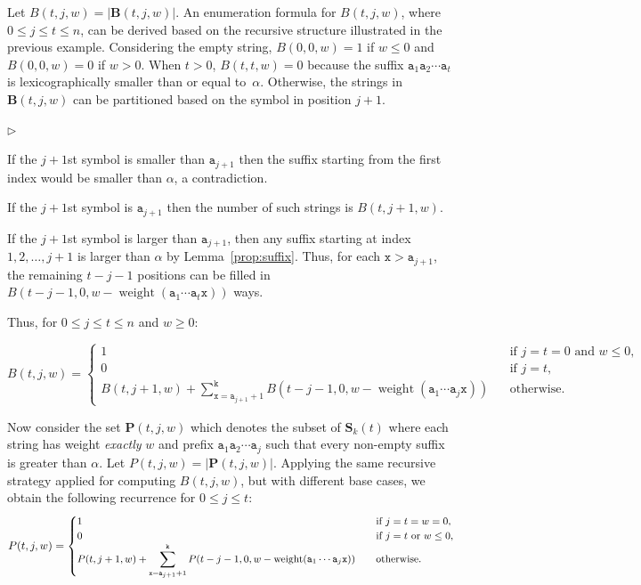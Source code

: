 \documentclass[US-letter,USenglish,authorcolumns,autoref]{lipics-v2021}
\renewcommand{\tt} {\mathtt}
\newcommand{\squishlisttwo}{
 \begin{list}{$\triangleright$}
  { \setlength{\itemsep}{0pt}
     \setlength{\parsep}{0pt}
    \setlength{\topsep}{0pt}
    \setlength{\partopsep}{0pt}
    \setlength{\leftmargin}{2em}
    \setlength{\labelwidth}{1.5em}
    \setlength{\labelsep}{0.5em} } }
\newcommand{\squishend}{
  \end{list}  }
\newcommand{\bS}{\mathbf{S}}
\DeclareMathOperator{\wt}{weight}
\begin{document}
%
\noindent
Let $B(t,j,w) = |\mathbf{B}(t,j,w)|$.
An enumeration formula for $B(t,j,w)$, where $0\leq j\leq t \leq n$, can be derived based on the recursive structure illustrated in the previous example.  Considering the empty string, $B(0,0,w) = 1$ if $w \leq 0$ and $B(0,0,w) = 0$ if $w > 0$.  When $t > 0$,  $B(t,t,w) = 0$ because  the suffix $\tt{a}_1\tt{a}_2\cdots \tt{a}_t$ is  lexicographically smaller than or equal to~$\alpha$.  Otherwise, the strings in $\mathbf{B}(t,j,w)$ can be partitioned based on the symbol in position $j{+}1$.
\squishlisttwo
\item If the $j{+}1$st symbol is smaller than $\tt{a}_{j+1}$  then the suffix starting from the first index would be smaller than $\alpha$, a contradiction.  
\item If the $j{+}1$st  symbol is $\tt{a}_{j+1}$ then the number of such strings is $B(t,j+1,w)$.  
\item If the $j{+}1$st  symbol is larger than $\tt{a}_{j+1}$, then any suffix starting at index $1,2,\ldots, j+1$ is 
larger than $\alpha$ by Lemma~\ref{prop:suffix}.  Thus, for each $\tt{x} > \tt{a}_{j+1}$, the remaining $t-j-1$ positions can be filled in $B(t-j-1,0,w-\wt(\tt{a}_1\cdots \tt{a}_t\tt{x}))$ ways.  
\squishend
Thus, for $0\leq j\leq t \leq n$ and $w \geq 0$:
%
\begin{center} \small
$B(t,j,w)  = \left\{ \begin{array}{ll}
    1	 \ & \ \  \   \mbox{if \ \ $j=t=0$ and $w \leq 0$, } \\
    0	 \ & \ \  \  \mbox{if \ \ $j=t$,} \\
    B(t,j+1,w) + \displaystyle{\sum_{\tt{x} = \tt{a}_{j+1}+1}^\tt{k} B(t-j-1,0, w-\wt(\tt{a}_1\cdots \tt{a}_j\tt{x})) } \  &\ \ \  \mbox{otherwise.}
    \end{array} \right.
            \label{eq:B}$
\end{center}
%


Now consider the set $\mathbf{P}(t,j,w)$ which denotes the subset of  $\bS_k(t)$ where each string has weight \emph{exactly} $w$ and prefix  $\tt{a}_1\tt{a}_2\cdots \tt{a}_{j}$ such that every non-empty suffix is greater than $\alpha$. Let $P(t,j,w) = |\mathbf{P}(t,j,w)|$.  Applying the same recursive strategy applied for computing $B(t,j,w)$, but with different base cases,  we obtain the following recurrence for $0\leq j \leq t$:
%
\[
\small 
{P}(t,j,w) = 
\begin{cases}	
	1 & \ \ \  \text{if } j=t=w=0, \\
	0 & \ \ \  \text{if } j=t \mbox{ or } w \leq 0,  \\
	{P}(t,j+1,w) + \displaystyle{
        \sum_{\tt{x}=\tt{a}_{j+1}+1}^{\tt{k}}P(t-j-1,0,w -\wt(\tt{a}_1\cdots \tt{a}_j\tt{x}))} & \ \ \ \text{otherwise}. \\
\end{cases}
\]
\normalsize
\end{document}
